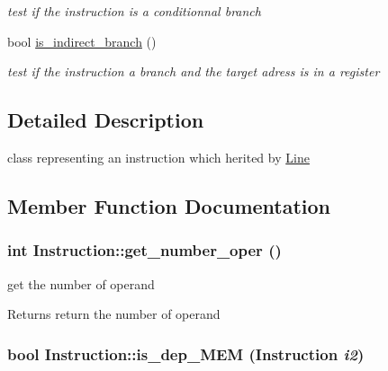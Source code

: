 \begin{DoxyCompactItemize}
\begin{DoxyCompactList}\small\item\em test if the instruction is a conditionnal branch \item\end{DoxyCompactList}\item 
\hypertarget{classInstruction_affdf2382cd36277fb4427cd3b07c1402}{
bool \hyperlink{classInstruction_affdf2382cd36277fb4427cd3b07c1402}{is\_\-indirect\_\-branch} ()}
\label{classInstruction_affdf2382cd36277fb4427cd3b07c1402}

\begin{DoxyCompactList}\small\item\em test if the instruction a branch and the target adress is in a register \item\end{DoxyCompactList}\end{DoxyCompactItemize}


\subsection{Detailed Description}
class representing an instruction which herited by \hyperlink{classLine}{Line} 

\subsection{Member Function Documentation}
\hypertarget{classInstruction_acc1449841171a23e873e32077cd7b835}{
\subsubsection[{get\_\-number\_\-oper}]{\setlength{\rightskip}{0pt plus 5cm}int Instruction::get\_\-number\_\-oper ()}}
\label{classInstruction_acc1449841171a23e873e32077cd7b835}


get the number of operand \begin{DoxyReturn}{Returns}
return the number of operand 
\end{DoxyReturn}
\hypertarget{classInstruction_af6cb68b3ab32666559bb81328d43adf9}{
\subsubsection[{is\_\-dep\_\-MEM}]{\setlength{\rightskip}{0pt plus 5cm}bool Instruction::is\_\-dep\_\-MEM ({\bf Instruction} {\em i2})}}
\label{classInstruction_af6cb68b3ab32666559bb81328d43adf9}


